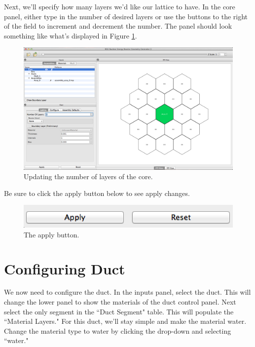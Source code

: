 Next, we'll specify how many layers we'd like our lattice to have.  In the core panel, either type in the number of desired layers or use the buttons to the right of the field to increment and decrement the number.  The panel should look something like what's displayed in Figure \ref{fig:Hex3}.

\begin{figure}[H]
	\begin{center}
		\includegraphics[width=0.5\linewidth]{Images/hex-increase-core-layers.png}
		\caption{Updating the number of layers of the core.}
		\label{fig:Hex3}
	\end{center}
\end{figure}

Be sure to click the apply button below to see apply changes.

\begin{figure}[H]
	\begin{center}
		\includegraphics[width=0.5\linewidth]{Images/hex-apply-button.png}
		\caption{The apply button.}
		\label{fig:Hex4}
	\end{center}
\end{figure}

\section{Configuring Duct}

We now need to configure the duct.  In the inputs panel, select the duct.   This will change the lower panel to show the materials of the duct control panel.  Next select the only segment in the ``Duct Segment" table.  This will populate the ``Material Layers."   For this duct, we'll stay simple and make the material water.  Change the material type to water by clicking the drop-down and selecting ``water."

